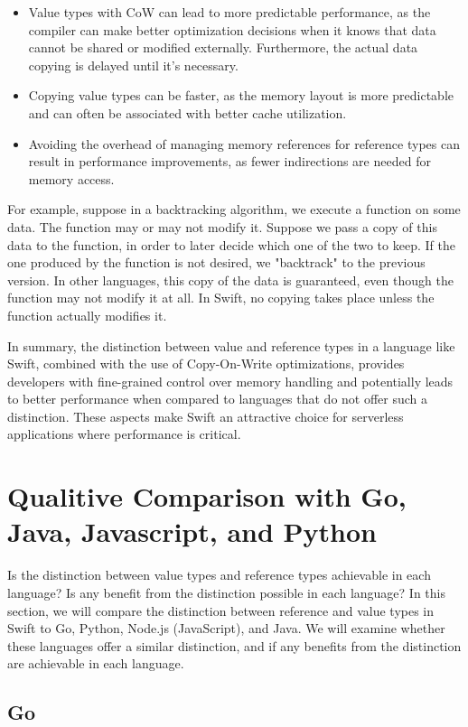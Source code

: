 \begin{itemize}
  \item Value types with CoW can lead to more predictable performance, as the compiler can make better optimization decisions when it knows that data cannot be shared or modified externally. Furthermore, the actual data copying is delayed until it's necessary.
  \item Copying value types can be faster, as the memory layout is more predictable and can often be associated with better cache utilization.
  \item Avoiding the overhead of managing memory references for reference types can result in performance improvements, as fewer indirections are needed for memory access.
\end{itemize}
For example, suppose in a backtracking algorithm, we execute a function on some data. The function may or may not modify it. Suppose we pass a copy of this data to the function, in order to later decide which one of the two to keep. If the one produced by the function is not desired, we "backtrack" to the previous version. In other languages, this copy of the data is guaranteed, even though the function may not modify it at all. In Swift, no copying takes place unless the function actually modifies it.

In summary, the distinction between value and reference types in a language like Swift, combined with the use of Copy-On-Write optimizations, provides developers with fine-grained control over memory handling and potentially leads to better performance when compared to languages that do not offer such a distinction. These aspects make Swift an attractive choice for serverless applications where performance is critical.


\section{Qualitive Comparison with Go, Java, Javascript, and Python}
Is the distinction between value types and reference types achievable in each language? Is any benefit from the distinction possible in each language? 
In this section, we will compare the distinction between reference and value types in Swift to Go, Python, Node.js (JavaScript), and Java. We will examine whether these languages offer a similar distinction, and if any benefits from the distinction are achievable in each language.

\subsection{Go}

